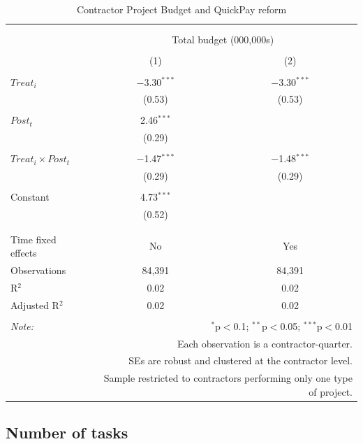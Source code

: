 \documentclass[
]{article}
\begin{document}
\begin{table}[H] \centering 
  \caption{Contractor Project Budget and QuickPay reform} 
  \label{} 
\small 
\begin{tabular}{@{\extracolsep{-2pt}}lcc} 
\\[-1.8ex]\hline 
\hline \\[-1.8ex] 
\\[-1.8ex] & \multicolumn{2}{c}{Total budget (000,000s)} \\ 
\\[-1.8ex] & (1) & (2)\\ 
\hline \\[-1.8ex] 
 $Treat_i$ & $-$3.30$^{***}$ & $-$3.30$^{***}$ \\ 
  & (0.53) & (0.53) \\ 
  & & \\ 
 $Post_t$ & 2.46$^{***}$ &  \\ 
  & (0.29) &  \\ 
  & & \\ 
 $Treat_i \times Post_t$ & $-$1.47$^{***}$ & $-$1.48$^{***}$ \\ 
  & (0.29) & (0.29) \\ 
  & & \\ 
 Constant & 4.73$^{***}$ &  \\ 
  & (0.52) &  \\ 
  & & \\ 
\hline \\[-1.8ex] 
Time fixed effects & No & Yes \\ 
Observations & 84,391 & 84,391 \\ 
R$^{2}$ & 0.02 & 0.02 \\ 
Adjusted R$^{2}$ & 0.02 & 0.02 \\ 
\hline 
\hline \\[-1.8ex] 
\textit{Note:}  & \multicolumn{2}{r}{$^{*}$p$<$0.1; $^{**}$p$<$0.05; $^{***}$p$<$0.01} \\ 
 & \multicolumn{2}{r}{Each observation is a contractor-quarter.} \\ 
 & \multicolumn{2}{r}{SEs are robust and clustered at the contractor level.} \\ 
 & \multicolumn{2}{r}{Sample restricted to contractors performing only one type of project.} \\ 
\end{tabular} 
\end{table}

\hypertarget{number-of-tasks}{%
\subsection{Number of tasks}\label{number-of-tasks}}
\end{document}
